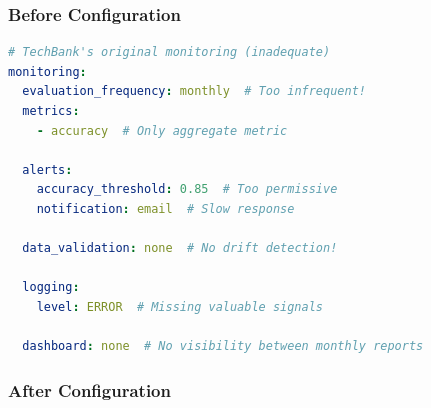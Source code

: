 \subsubsection{Before Configuration}

\begin{lstlisting}[language=yaml, caption={Inadequate Monitoring Configuration}]
# TechBank's original monitoring (inadequate)
monitoring:
  evaluation_frequency: monthly  # Too infrequent!
  metrics:
    - accuracy  # Only aggregate metric

  alerts:
    accuracy_threshold: 0.85  # Too permissive
    notification: email  # Slow response

  data_validation: none  # No drift detection!

  logging:
    level: ERROR  # Missing valuable signals

  dashboard: none  # No visibility between monthly reports
\end{lstlisting}

\subsubsection{After Configuration}

